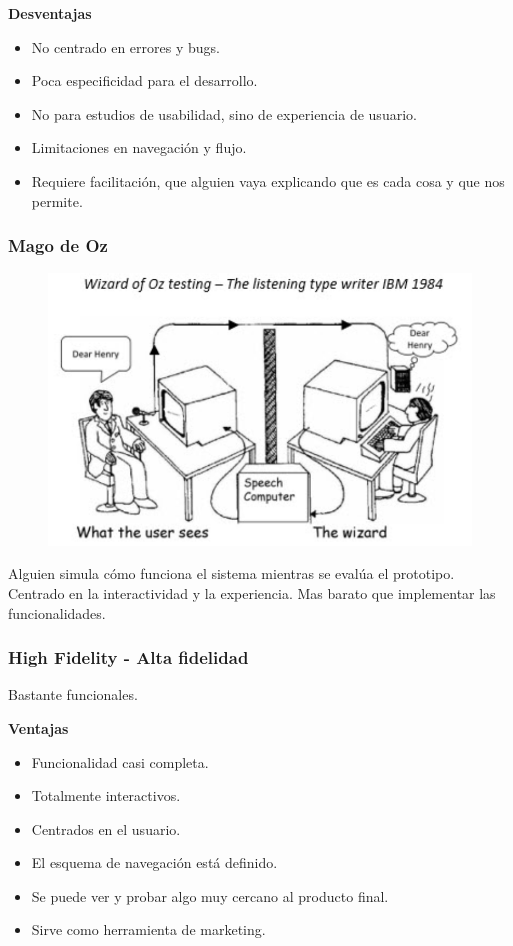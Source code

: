 \documentclass[12pt]{report} %
\begin{document}
  \textbf{Desventajas}
  \begin{itemize}
    \item No centrado en errores y bugs.
    \item Poca especificidad para el desarrollo.
    \item No para estudios de usabilidad, sino de experiencia de usuario.
    \item Limitaciones en navegación y flujo.
    \item Requiere facilitación, que alguien vaya explicando que es cada cosa y que nos permite.
  \end{itemize}
  
  \subsubsection{Mago de Oz}

  \begin{figure}[H]
    {\includegraphics[scale=.4]{2021-03-20 23_48_56-L5.pdf - Foxit Reader.png}}
  \end{figure}

  Alguien simula cómo funciona el sistema mientras se evalúa el prototipo. Centrado en la interactividad y la experiencia. Mas barato que implementar las funcionalidades.

  \subsubsection{High Fidelity - Alta fidelidad}
  Bastante funcionales.

  \textbf{Ventajas}
  \begin{itemize}
    \item Funcionalidad casi completa.
    \item Totalmente interactivos.
    \item Centrados en el usuario.
    \item El esquema de navegación está definido.
    \item Se puede ver y probar algo muy cercano al producto final.
    \item Sirve como herramienta de marketing.
  \end{itemize}
\end{document}
